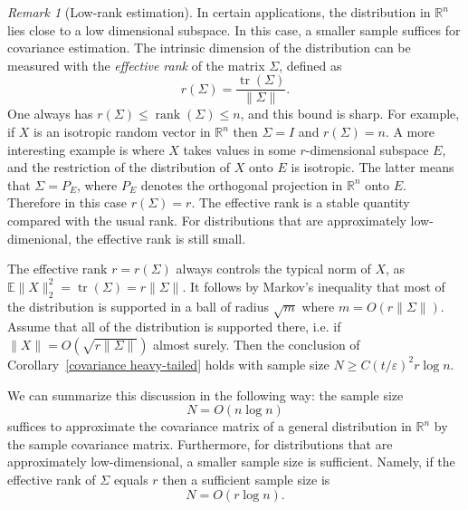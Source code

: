 \documentclass[10pt, openany]{book}
\theoremstyle{remark}
\newtheorem{remark}[theorem]{Remark}
\DeclareMathOperator{\tr}{tr}
\DeclareMathOperator{\rank}{rank}
\def \R {\mathbb{R}}
\def \E {\mathbb{E}}
\def \e {\varepsilon}
\def \S {\Sigma}
\begin{document}
\begin{remark}[Low-rank estimation]
  In certain applications, the distribution in $\R^n$ lies close to a low dimensional subspace.
  In this case, a smaller sample suffices for covariance estimation. The intrinsic dimension 
  of the distribution can be measured with the {\em effective rank} 
  of the matrix $\Sigma$, defined as
  $$
  r(\Sigma) = \frac{\tr(\Sigma)}{\|\Sigma\|}. 
  $$
  One always has $r(\Sigma) \le \rank(\Sigma) \le n$, and this bound is sharp. 
  For example, if $X$ is an isotropic random vector in $\R^n$ then $\S = I$ and $r(\Sigma) = n$. 
  A more interesting example is where $X$ takes values in some $r$-dimensional subspace $E$,
  and the restriction of the distribution of $X$ onto $E$ is isotropic. The latter means that 
  $\Sigma = P_E$, where $P_E$ denotes the orthogonal projection in $\R^n$ onto $E$.
  Therefore in this case $r(\Sigma) = r$. The effective rank is a stable quantity compared with the 
  usual rank. For distributions that are approximately low-dimenional, the effective rank is 
  still small.
    
  The effective rank $r = r(\Sigma)$ always controls the typical norm of $X$, 
  as $\E \|X\|_2^2  = \tr(\Sigma) = r \|\Sigma\|$.
  It follows by Markov's inequality that most of the distribution is supported in a ball of radius $\sqrt{m}$ where
  $m = O(r \|\Sigma\|)$. Assume that all of the distribution is supported there, i.e. if $\|X\| = O(\sqrt{r \|\Sigma\|})$ 
  almost surely. Then the conclusion of Corollary~\ref{covariance heavy-tailed} holds 
  with sample size $N \ge C(t/\e)^2 r \log n$.
\end{remark}

We can summarize this discussion in the following way: the sample size
$$
N = O(n \log n)
$$ 
suffices to approximate the covariance matrix of a general distribution in $\R^n$ by the sample covariance matrix. 
Furthermore, for distributions that are approximately low-dimensional, a smaller sample size is sufficient. 
Namely, if the effective rank of $\Sigma$ equals $r$ then a sufficient sample size is 
$$
N = O(r \log n).
$$
\end{document}
